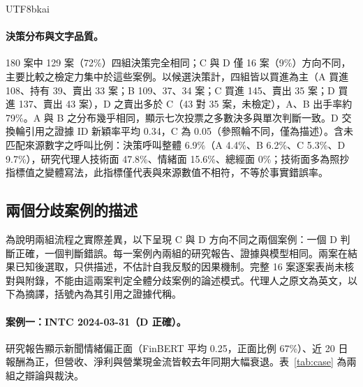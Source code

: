 \documentclass[12pt,a4paper]{article}
\newcommand{\grp}[1]{\textsf{#1}}
\begin{document}
\begin{CJK}{UTF8}{bkai}
\paragraph{決策分布與文字品質。} 180 案中 129 案（72\%）四組決策完全相同；\grp{C} 與 \grp{D} 僅 16 案（9\%）方向不同，主要比較之檢定力集中於這些案例。以候選決策計，四組皆以買進為主（\grp{A} 買進 108、持有 39、賣出 33 案；\grp{B} 109、37、34 案；\grp{C} 買進 145、賣出 35 案；\grp{D} 買進 137、賣出 43 案），\grp{D} 之賣出多於 \grp{C}（43 對 35 案，未檢定），\grp{A}、\grp{B} 出手率約 79\%。\grp{A} 與 \grp{B} 之分布幾乎相同，顯示七次投票之多數決多與單次判斷一致。\grp{D} 交換輪引用之證據 ID 新穎率平均 0.34，\grp{C} 為 0.05（參照輪不同，僅為描述）。含未匹配來源數字之呼叫比例：決策呼叫整體 6.9\%（\grp{A} 4.4\%、\grp{B} 6.2\%、\grp{C} 5.3\%、\grp{D} 9.7\%），研究代理人技術面 47.8\%、情緒面 15.6\%、總經面 0\%；技術面多為照抄指標值之變體寫法，此指標僅代表與來源數值不相符，不等於事實錯誤率。

\subsection{兩個分歧案例的描述}
\label{sec:casestudy}

為說明兩組流程之實際差異，以下呈現 \grp{C} 與 \grp{D} 方向不同之兩個案例：一個 \grp{D} 判斷正確，一個判斷錯誤。每一案例內兩組的研究報告、證據與模型相同。兩案在結果已知後選取，只供描述，不估計自我反駁的因果機制。完整 16 案逐案表尚未核對與附錄，不能由這兩案判定全體分歧案例的論述模式。代理人之原文為英文，以下為摘譯，括號內為其引用之證據代稱。

\paragraph{案例一：INTC 2024-03-31（\grp{D} 正確）。} 研究報告顯示新聞情緒偏正面（FinBERT 平均 0.25，正面比例 67\%）、近 20 日報酬為正，但營收、淨利與營業現金流皆較去年同期大幅衰退。表~\ref{tab:case} 為兩組之辯論與裁決。


\end{CJK}
\end{document}
